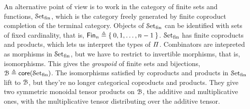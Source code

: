 
An alternative point of view is to work in the category of finite sets and functions, $\SetFin$, which is the category
freely generated by finite coproduct completion of the terminal category. Objects of $\SetFin$ can be identified with
sets of fixed cardinality, that is, $\Fin[n] \defeq \Set{0,1,\ldots,n-1}$. $\SetFin$ has finite coproducts and products,
which lets us interpret the types of $\mathit{\Pi}$. Combinators are intepreted as morphisms in $\SetFin$, but we have to
restrict to invertible morphisms, that is, isomorphisms. This gives the \emph{groupoid} of finite sets and bijections,
$\BFin \defeq \mathsf{core}(\SetFin)$. The isomorphisms satisfied by coproducts and products in $\SetFin$ lift to
$\BFin$, but they're no longer categorical coproducts and products. They give two symmetric monoidal tensor products on
$\BFin$, the additive and multiplicative ones, with the multiplicative tensor distributing over the additive tensor.




